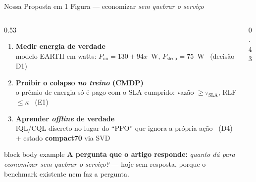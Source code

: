 \documentclass[aspectratio=169,10pt,xcolor={dvipsnames,table}]{beamer}
\begin{document}

\begin{frame}{Nossa Proposta em 1 Figura --- economizar \emph{sem quebrar o servi\c{c}o}}
  \begin{columns}[T]
    \begin{column}{0.53\textwidth}
      \begin{enumerate}
        \item \textbf{Medir energia de verdade}\\
          {\small modelo EARTH em watts: $P_{\text{on}} = 130 + 94x$~W,
          $P_{\text{sleep}} = 75$~W \ (decis\~ao D1)}
        \item \textbf{Proibir o colapso \emph{no treino} (CMDP)}\\
          {\small o pr\^emio de energia s\'o \'e pago com o SLA cumprido:
          vaz\~ao $\ge \tau_{\text{SLA}}$, RLF $\le \kappa$ \ (E1)}
        \item \textbf{Aprender \emph{offline} de verdade}\\
          {\small IQL/CQL discreto no lugar do ``PPO'' que ignora a pr\'opria
          a\c{c}\~ao \ (D4) $+$ estado \textbf{compact70} via SVD}
      \end{enumerate}
      \vspace{1.5mm}
      \begin{beamercolorbox}[wd=\textwidth,sep=3pt]{block body example}
        \small \textbf{A pergunta que o artigo responde:} \emph{quanto d\'a para
        economizar sem quebrar o servi\c{c}o?} --- hoje sem resposta, porque o
        benchmark existente nem faz a pergunta.
      \end{beamercolorbox}
    \end{column}
    \begin{column}{0.43\textwidth}
      \begin{center}
      \begin{tikzpicture}

\end{tikzpicture}
\end{center}
\end{column}
\end{columns}
\end{frame}
\end{document}
